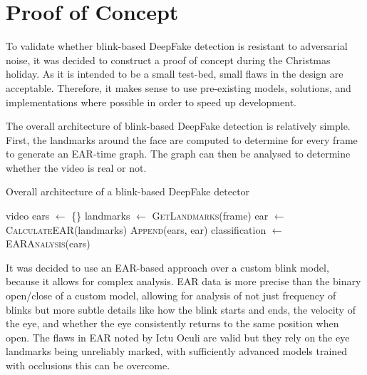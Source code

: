 \section{Proof of Concept}
\label{sec:concept-design}


To validate whether blink-based DeepFake detection is resistant to adversarial noise, it was decided to construct a proof of concept during the Christmas holiday. As it is intended to be a small test-bed, small flaws in the design are acceptable. Therefore, it makes sense to use pre-existing models, solutions, and implementations where possible in order to speed up development.

The overall architecture of blink-based DeepFake detection is relatively simple. First, the landmarks around the face are computed to determine for every frame to generate an EAR-time graph. The graph can then be analysed to determine whether the video is real or not. 

\begin{algorithm}[h]
    \caption{Overall architecture of a blink-based DeepFake detector}
    \label{alg:blink-based}
    \begin{algorithmic}
        \Require video
        \State ears $\gets$ \{\}
            \State landmarks $\gets$ \textsc{GetLandmarks}(frame)
            \State ear $\gets$ \textsc{CalculateEAR}(landmarks)
            \State \textsc{Append}(ears, ear)
        \EndFor
        \State classification $\gets$ \textsc{EARAnalysis}(ears)
    \end{algorithmic}
\end{algorithm}

It was decided to use an EAR-based approach over a custom blink model, because it allows for complex analysis. EAR data is more precise than the binary open/close of a custom model, allowing for analysis of not just frequency of blinks but more subtle details like how the blink starts and ends, the velocity of the eye, and whether the eye consistently returns to the same position when open. The flaws in EAR noted by Ictu Oculi\cite{li2018ictu} are valid but they rely on the eye landmarks being unreliably marked, with sufficiently advanced models trained with occlusions this can be overcome. 

